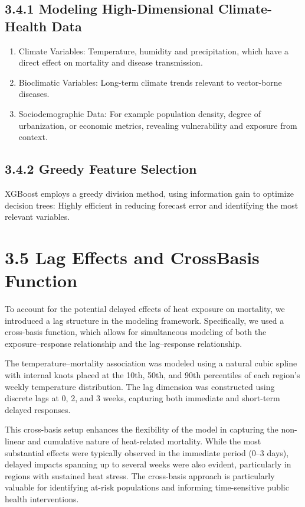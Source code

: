 \documentclass[
]{krantz}
\begin{document}
\subsection{3.4.1 Modeling High-Dimensional Climate-Health Data}\label{modeling-high-dimensional-climate-health-data}

\begin{enumerate}
\def\labelenumi{\arabic{enumi}.}
\item
  Climate Variables: Temperature, humidity and precipitation, which have a direct effect on mortality and disease transmission.
\item
  Bioclimatic Variables: Long-term climate trends relevant to vector-borne diseases.
\item
  Sociodemographic Data: For example population density, degree of urbanization, or economic metrics, revealing vulnerability and exposure from context.
\end{enumerate}

\subsection{3.4.2 Greedy Feature Selection}\label{greedy-feature-selection}

XGBoost employs a greedy division method, using information gain to optimize decision trees:
Highly efficient in reducing forecast error and identifying the most relevant variables.

\section{3.5 Lag Effects and CrossBasis Function}\label{lag-effects-and-crossbasis-function}

To account for the potential delayed effects of heat exposure on mortality, we introduced a lag structure in the modeling framework. Specifically, we used a cross-basis function, which allows for simultaneous modeling of both the exposure--response relationship and the lag--response relationship.

The temperature--mortality association was modeled using a natural cubic spline with internal knots placed at the 10th, 50th, and 90th percentiles of each region's weekly temperature distribution. The lag dimension was constructed using discrete lags at 0, 2, and 3 weeks, capturing both immediate and short-term delayed responses.

This cross-basis setup enhances the flexibility of the model in capturing the non-linear and cumulative nature of heat-related mortality. While the most substantial effects were typically observed in the immediate period (0--3 days), delayed impacts spanning up to several weeks were also evident, particularly in regions with sustained heat stress. The cross-basis approach is particularly valuable for identifying at-risk populations and informing time-sensitive public health interventions.
\end{document}
